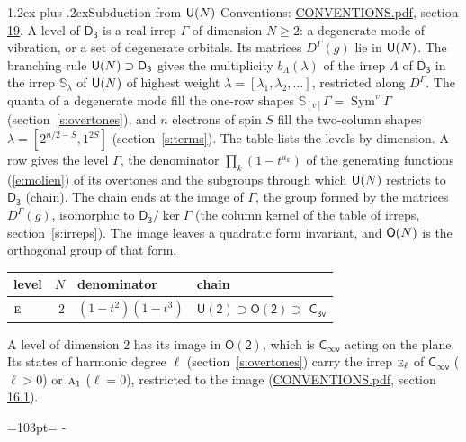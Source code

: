 \documentclass[10pt,a4paper]{article}
\makeatletter
\renewcommand\section{\@startsection{section}{1}{\z@}{-3ex plus -1ex minus -.2ex}%
  {1.2ex plus .2ex}{\normalfont\large\sffamily\bfseries\color{parttitle}}}
\newcommand{\needspace}[1]{\par\penalty-100\begingroup\dimen0=#1\relax\dimen2=\pagegoal
  \advance\dimen2-\pagetotal\ifdim\dimen0>\dimen2\relax\ifdim\dimen2>0pt\vfil\break\fi\fi
  \endgroup}
\numberwithin{equation}{section}
\newcommand{\grp}[1]{\mathsf{#1}}
\newcommand{\irr}[1]{\text{\normalfont\scshape #1}}
\newcommand{\repD}[1]{D^{#1}}
\newcommand{\schur}[1]{\mathbb{S}_{#1}}
\newcommand{\shape}[1]{[#1]}
\makeatother
\begin{document}
\section{Subduction from \texorpdfstring{$\grp{U(\mathnormal{N})}$}{U(N)}}\label{s:unitary}
Conventions: \href{../../CONVENTIONS.pdf}{CONVENTIONS.pdf}, section \href{../../CONVENTIONS.pdf\#conv.19}{19}.
\leavevmode\label{n:local.level.dimension}A level of $\grp{D_{3}}$ is a real irrep $\Gamma$ of dimension $N \ge 2$: a degenerate mode of vibration, or a set of degenerate orbitals. \label{n:group.unitary}Its matrices $\repD{\Gamma}(g)$ lie in $\grp{U(\mathnormal{N})}$. \label{n:irrep.schur}\label{n:shape.partition}\label{n:local.partition}\label{n:function.multiplicity.unitary}The branching rule $\grp{U(\mathnormal{N})} \supset \grp{D_{3}}$ gives the multiplicity $b_\Lambda(\lambda)$ of the irrep $\Lambda$ of $\grp{D_{3}}$ in the irrep $\schur{\lambda}$ of $\grp{U(\mathnormal{N})}$ of highest weight $\lambda = \shape{\lambda_1, \lambda_2, \dots}$, restricted along $\repD{\Gamma}$. \label{n:local.partition.power}\label{n:local.electrons}\label{n:local.spin}The quanta of a degenerate mode fill the one-row shapes $\schur{\shape{v}}\Gamma = \operatorname{Sym}^{v}\Gamma$ (section~\ref{s:overtones}), and $n$ electrons of spin $S$ fill the two-column shapes $\lambda = \shape{2^{n/2-S}, 1^{2S}}$ (section~\ref{s:terms}).
The table lists the levels by dimension. \label{n:head.level}\label{n:head.denominator}\label{n:index.overtone.denominator}\label{n:head.chain}A row gives the level $\Gamma$, the denominator $\prod_k (1 - t^{a_k})$ of the generating functions (\ref{e:molien}) of its overtones and the subgroups through which $\grp{U(\mathnormal{N})}$ restricts to $\grp{D_{3}}$ (chain). The chain ends at the image of $\Gamma$, the group formed by the matrices $\repD{\Gamma}(g)$, isomorphic to $\grp{D_{3}}/\ker\Gamma$ (the column kernel of the table of irreps, section~\ref{s:irreps}). The image leaves a quadratic form invariant, and $\grp{O(\mathnormal{N})}$ is the orthogonal group of that form.
{\small\begin{longtable}{@{}lrll@{}}\toprule
level & $N$ & denominator & chain\\\midrule\endhead
\bottomrule\endfoot\endlastfoot
$\irr{e}$ & 2 & $(1-t^{2})(1-t^{3})$ & $\grp{U(2)} \supset \grp{O(2)} \supset$ \href{C3v.pdf}{$\grp{C_{3v}}$}\\
\bottomrule\end{longtable}}
A level of dimension 2 has its image in $\grp{O(2)}$, which is \href{Cinfv.pdf}{$\grp{C_{\infty v}}$} acting on the plane. \label{n:index.harmonic.degree}Its states of harmonic degree $\ell$ (section~\ref{s:overtones}) carry the irrep $\irr{e}_{\ell}$ of \href{Cinfv.pdf}{$\grp{C_{\infty v}}$} ($\ell > 0$) or $\irr{a}_{1}$ ($\ell = 0$), restricted to the image (\href{../../CONVENTIONS.pdf}{CONVENTIONS.pdf}, section \href{../../CONVENTIONS.pdf\#conv.16.1}{16.1}).
\needspace{103pt}
\end{document}

